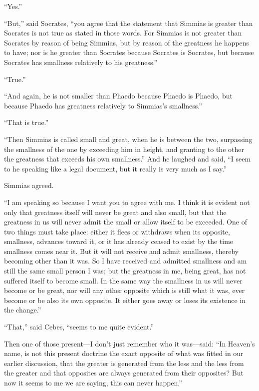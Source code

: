 \documentclass[letterpaper,12pt]{article}
\newcommand{\stephpag}[1]{\marginnote{\small\itshape\fontfamily{ppl}\selectfont #1}}
\begin{document}
\begin{drama}
``Yes.''
 
``But,'' said Socrates, ``you agree that the statement that Simmias is greater than Socrates is not true as stated in those words. For Simmias is not greater than Socrates \stephpag{c} by reason of being Simmias, but by reason of the greatness he happens to have; nor is he greater than Socrates because Socrates is Socrates, but because Socrates has smallness relatively to his greatness.''
 
``True.''
 
``And again, he is not smaller than Phaedo because Phaedo is Phaedo, but because Phaedo has greatness relatively to Simmias's smallness.''
 
``That is true.''
 
``Then Simmias is called small and great, when he is between the two, \stephpag{d} surpassing the smallness of the one by exceeding him in height, and granting to the other the greatness that exceeds his own smallness.'' And he laughed and said, ``I seem to he speaking like a legal document, but it really is very much as I say.''
 
Simmias agreed.
 
``I am speaking so because I want you to agree with me. I think it is evident not only that greatness itself will never be great and also small, but that the greatness in us will never admit the small or allow itself to be exceeded. One of two things must take place: either it flees or withdraws when \stephpag{e} its opposite, smallness, advances toward it, or it has already ceased to exist by the time smallness comes near it. But it will not receive and admit smallness, thereby becoming other than it was. So I have received and admitted smallness and am still the same small person I was; but the greatness in me, being great, has not suffered itself to become small. In the same way the smallness in us will never become or be great, nor will any other opposite which is still what it was, ever become or be also its own opposite. \stephpag{103 a} It either goes away or loses its existence in the change.''
 
``That,'' said Cebes, ``seems to me quite evident.''
 
Then one of those present---I don't just remember who it was---said: ``In Heaven's name, is not this present doctrine the exact opposite of what was fitted in our earlier discussion, that the greater is generated from the less and the less from the greater and that opposites are always generated from their opposites? But now it seems to me we are saying, this can never happen.''
 

\end{drama}
\end{document}
